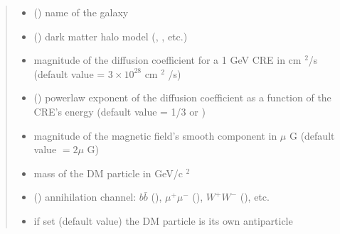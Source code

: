 \documentclass[letterpaper,10pt,english]{sphinxmanual}
\begin{document}
\begin{fulllineitems}
\begin{quote}
\begin{description}
\begin{itemize}
\item {} 
\sphinxAtStartPar
{} () \textendash{} name of the galaxy

\item {} 
\sphinxAtStartPar
{} () \textendash{} dark matter halo model (, , etc.)

\item {} 
\sphinxAtStartPar
{} \textendash{} magnitude of the diffusion coefficient for a 1 GeV CRE in cm \({}^2\)/s (default value = \(3\times 10^{28}\) cm \({}^2\) /s)

\item {} 
\sphinxAtStartPar
{} (\sphinxstyleliteralemphasis{\sphinxupquote{, }}) \textendash{} power\sphinxhyphen{}law exponent of the diffusion coefficient as a function of the CRE’s energy (default value = 1/3 or )

\item {} 
\sphinxAtStartPar
{} \textendash{} magnitude of the magnetic field’s smooth component in \(\mu\) G (default value \(= 2 \mu\) G)

\item {} 
\sphinxAtStartPar
{} \textendash{} mass of the DM particle in GeV/c \({}^2\)

\item {} 
\sphinxAtStartPar
{} () \textendash{} annihilation channel: \(b\bar b\) (), \(\mu^+ \mu^-\) (), \(W^+ W^-\) (), etc.

\item {} 
\sphinxAtStartPar
{} \textendash{} if set  (default value) the DM particle is its own antiparticle


\end{itemize}
\end{description}
\end{quote}
\end{fulllineitems}
\end{document}
